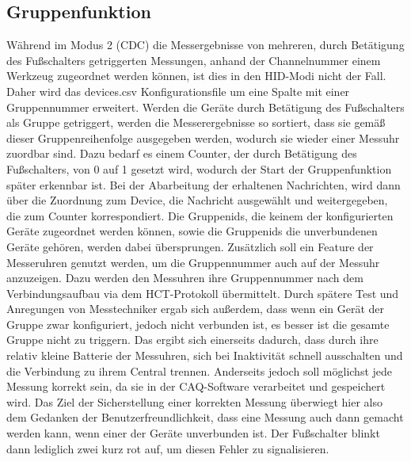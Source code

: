 \subsection{Gruppenfunktion}
Während im Modus 2 (CDC) die Messergebnisse von mehreren, durch Betätigung des Fußschalters getriggerten Messungen, anhand der Channelnummer einem Werkzeug zugeordnet werden können, ist dies in den HID-Modi nicht der Fall. Daher wird das devices.csv Konfigurationsfile um eine Spalte mit einer Gruppennummer erweitert. Werden die Geräte durch Betätigung des Fußschalters als Gruppe getriggert, werden die Messerergebnisse so sortiert, dass sie gemäß dieser Gruppenreihenfolge ausgegeben werden, wodurch sie wieder einer Messuhr zuordbar sind. Dazu bedarf es einem Counter, der durch Betätigung des Fußschalters, von 0 auf 1 gesetzt wird, wodurch der Start der Gruppenfunktion später erkennbar ist. Bei der Abarbeitung der erhaltenen Nachrichten, wird dann über die Zuordnung zum Device, die Nachricht ausgewählt und weitergegeben, die zum Counter korrespondiert. Die Gruppenids, die keinem der konfigurierten Geräte zugeordnet werden können, sowie die Gruppenids die unverbundenen Geräte gehören, werden dabei übersprungen. Zusätzlich soll ein Feature der Messeruhren genutzt werden, um die Gruppennummer auch auf der Messuhr anzuzeigen. Dazu werden den Messuhren ihre Gruppennummer nach dem Verbindungsaufbau via dem HCT-Protokoll übermittelt. Durch spätere Test und Anregungen von Messtechniker ergab sich außerdem, dass wenn ein Gerät der Gruppe zwar konfiguriert, jedoch nicht verbunden ist, es besser ist die gesamte Gruppe nicht zu triggern. Das ergibt sich einerseits dadurch, dass durch ihre relativ kleine Batterie der Messuhren, sich bei Inaktivität schnell ausschalten und die Verbindung zu ihrem Central trennen. Anderseits jedoch soll möglichst jede Messung korrekt sein, da sie in der CAQ-Software verarbeitet und gespeichert wird. Das Ziel der Sicherstellung einer korrekten Messung überwiegt hier also dem Gedanken der Benutzerfreundlichkeit, dass eine Messung auch dann gemacht werden kann, wenn einer der Geräte unverbunden ist. Der Fußschalter blinkt dann lediglich zwei kurz rot auf, um diesen Fehler zu signalisieren.